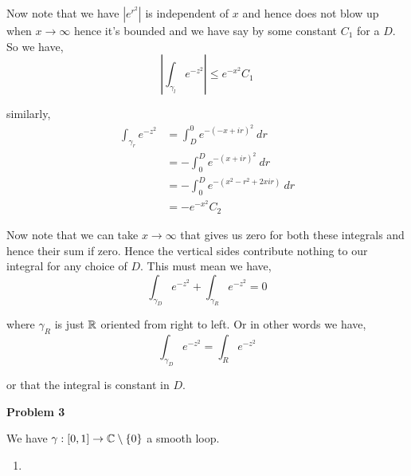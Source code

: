 \documentclass[a4paper]{article}
\begin{document}
Now note that we have $ \left| e^{r^2} \right |$ is independent of $x$ and hence does not blow up when $x \to \infty$ hence it's bounded and we have  say by some constant $C_{1}$ for a $D$. So we have, 
\[
  \left | \int_{\gamma_l}^{} e^{-z^2}\right | \le e^{-x^2} C_{1}
\]

\vspace{1em}

similarly,
\begin{align*}
  \int_{\gamma_r}^{} e^{-z^2}  &=  \int_{D}^{0} e^{- (-x + ir)^2}  \ dr\\
                               &= -\int_{0}^{D} e^{- (x + ir)^2}  \ dr\\
                               &= - \int_{0}^{D} e^{- (x^2 - r^2 + 2x i r)}  \ dr\\
                               &= - e^{-x^2} C_{2}
\end{align*}

Now note that we can take $x \to \infty$ that gives us zero for both these integrals and hence their sum if zero. Hence the vertical sides contribute nothing to our integral for any choice of $D$. This must mean we have, 
\[
  \int_{\gamma_D}^{} e^{-z^2} + \int_{\gamma_R}^{}  e^{-z^2} = 0
\]

where $\gamma_R$ is just $\mathbb{R}$ oriented from right to left. Or in other words we have, 
\[
  \int_{\gamma_D}^{}  e^{-z^2} = \int_{R}^{} e^{-z^2} 
\]

or that the integral is constant in $D$.


\vspace{1em}

\textbf{Problem 3}

We have $\gamma: [0, 1] \to \mathbb{C} \setminus \{0\}$ a smooth loop.


\begin{enumerate}
  \item 
\end{enumerate}
\end{document}
